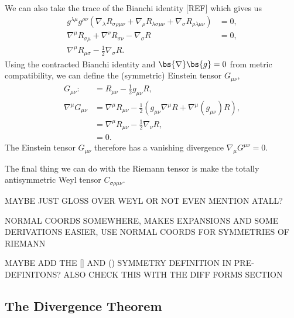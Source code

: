 We can also take the trace of the Bianchi identity [REF] which gives us 
\begin{align}
g^{\lambda\mu}g^{\rho\nu} (\nabla_\lambda R_{\sigma\rho\mu\nu} + \nabla_\rho R_{\lambda\sigma\mu\nu} + \nabla_\sigma R_{\rho\lambda\mu\nu}) &= 0 , \\
 \nabla^\mu R_{\sigma\mu} + \nabla^\nu R_{\sigma\nu} - \nabla_\sigma R &= 0 , \\
 \nabla^\mu R_{\mu\sigma} - \frac{1}{2}\nabla_\sigma R.
\end{align}
Using the contracted Bianchi identity and $\bs{\nabla}\bs{g}=0$ from metric compatibility, we can define the (symmetric) Einstein tensor $G_{\mu\nu}$,
\begin{align}
G_{\mu\nu} :&= R_{\mu\nu} - \frac{1}{2}g_{\mu\nu}R, \\
\nabla^\mu G_{\mu\nu} &= \nabla^\mu R_{\mu\nu} - \frac{1}{2}\left(g_{\mu\nu}\nabla^\mu R + \nabla^\mu (g_{\mu\nu})R\right) ,\\
&= \nabla^\mu R_{\mu\nu} - \frac{1}{2}\nabla_\nu R  ,\\
&=0.
\end{align}
The Einstein tensor $G_{\mu\nu}$ therefore has a vanishing divergence $\nabla_\mu G^{\mu\nu}=0$.

The final thing we can do with the Riemann tensor is make the totally antisymmetric Weyl tensor $C_{\sigma\rho\mu\nu}$.

MAYBE JUST GLOSS OVER WEYL OR NOT EVEN MENTION ATALL?


NORMAL COORDS SOMEWHERE, MAKES EXPANSIONS AND SOME DERIVATIONS EASIER, USE NORMAL COORDS FOR SYMMETRIES OF RIEMANN

MAYBE ADD THE [] AND () SYMMETRY DEFINITION IN PRE-DEFINITONS? ALSO CHECK THIS WITH THE DIFF FORMS SECTION




 



\subsection{The Divergence Theorem}

